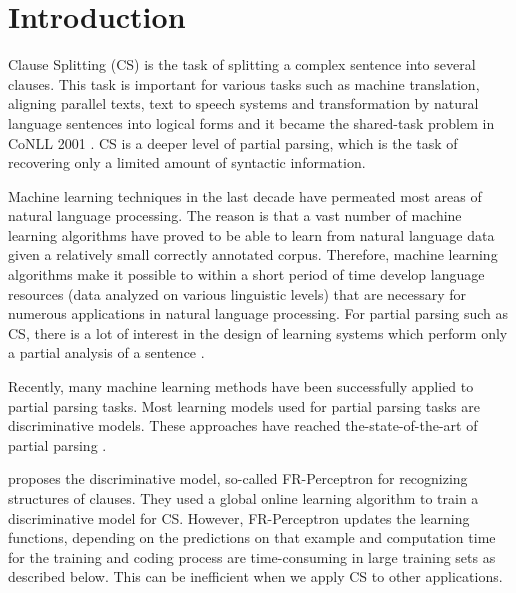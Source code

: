 \documentclass[english]{jnlp_1.4}
\begin{document}
\maketitle

\section{Introduction}

Clause Splitting (CS) is the task of splitting a complex sentence
into several clauses. This task is important for various tasks
such as machine translation, aligning parallel texts, text to
speech systems and transformation by natural language sentences
into logical forms and it became the shared-task problem in CoNLL
2001 \cite{Sang2001}. CS is a deeper level of partial parsing,
which is the task of recovering only a limited amount of syntactic
information.

Machine learning techniques in the last decade have permeated most
areas of natural language processing. The reason is that a vast
number of machine learning algorithms have proved to be able to
learn from natural language data given a relatively small correctly
annotated corpus. Therefore, machine learning algorithms make it
possible to within a short period of time develop language resources
(data analyzed on various linguistic levels) that are necessary for
numerous applications in natural language processing. For partial
parsing such as CS, there is a lot of interest in the design of
learning systems which perform only a partial analysis of a sentence
\cite{Abney91,Hammerton2002}.

Recently, many machine learning methods have been successfully
applied to partial parsing tasks. Most learning models used for
partial parsing tasks are discriminative models. These approaches
have reached the-state-of-the-art of partial parsing
\cite{Kudo2001,Carreras2005,Ando2005}.

\cite{Carreras2005} proposes the discriminative model, so-called
FR-Perceptron \cite{Collins2002} for recognizing structures of
clauses. They used a global online learning algorithm to train a
discriminative model for CS. However, FR-Perceptron updates the
learning functions, depending on the predictions on that example and
computation time for the training and coding process are
time-consuming in large training sets as described below. This can
be inefficient when we apply CS to other applications.
\end{document}
